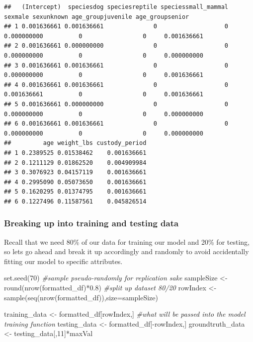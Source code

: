 \documentclass[
]{article}
\newenvironment{Shaded}{\begin{snugshade}}{\end{snugshade}}
\newcommand{\AttributeTok}[1]{\textcolor[rgb]{0.77,0.63,0.00}{#1}}
\newcommand{\CommentTok}[1]{\textcolor[rgb]{0.56,0.35,0.01}{\textit{#1}}}
\newcommand{\DecValTok}[1]{\textcolor[rgb]{0.00,0.00,0.81}{#1}}
\newcommand{\FloatTok}[1]{\textcolor[rgb]{0.00,0.00,0.81}{#1}}
\newcommand{\FunctionTok}[1]{\textcolor[rgb]{0.00,0.00,0.00}{#1}}
\newcommand{\NormalTok}[1]{#1}
\newcommand{\OtherTok}[1]{\textcolor[rgb]{0.56,0.35,0.01}{#1}}
\newcommand{\SpecialCharTok}[1]{\textcolor[rgb]{0.00,0.00,0.00}{#1}}
\begin{document}
\begin{verbatim}
##   (Intercept)  speciesdog speciesreptile speciessmall_mammal     sexmale sexunknown age_groupjuvenile age_groupsenior
## 1 0.001636661 0.001636661              0                   0 0.000000000          0                 0     0.001636661
## 2 0.001636661 0.000000000              0                   0 0.000000000          0                 0     0.000000000
## 3 0.001636661 0.001636661              0                   0 0.000000000          0                 0     0.001636661
## 4 0.001636661 0.001636661              0                   0 0.001636661          0                 0     0.001636661
## 5 0.001636661 0.000000000              0                   0 0.000000000          0                 0     0.000000000
## 6 0.001636661 0.001636661              0                   0 0.000000000          0                 0     0.000000000
##         age weight_lbs custody_period
## 1 0.2389525 0.01538462    0.001636661
## 2 0.1211129 0.01862520    0.004909984
## 3 0.3076923 0.04157119    0.001636661
## 4 0.2995090 0.05073650    0.001636661
## 5 0.1620295 0.01374795    0.001636661
## 6 0.1227496 0.11587561    0.045826514
\end{verbatim}

\hypertarget{breaking-up-into-training-and-testing-data}{%
\subsubsection{Breaking up into training and testing
data}\label{breaking-up-into-training-and-testing-data}}

Recall that we need 80\% of our data for training our model and 20\% for
testing, so lets go ahead and break it up accordingly and randomly to
avoid accidentally fitting our model to specific attributes.

\begin{Shaded}
\begin{Highlighting}[]
\FunctionTok{set.seed}\NormalTok{(}\DecValTok{70}\NormalTok{) }\CommentTok{\#sample pseudo{-}randomly for replication sake}
\NormalTok{sampleSize }\OtherTok{\textless{}{-}} \FunctionTok{round}\NormalTok{(}\FunctionTok{nrow}\NormalTok{(formatted\_df)}\SpecialCharTok{*}\FloatTok{0.8}\NormalTok{) }\CommentTok{\#split up dataset 80/20}
\NormalTok{rowIndex }\OtherTok{\textless{}{-}} \FunctionTok{sample}\NormalTok{(}\FunctionTok{seq}\NormalTok{(}\FunctionTok{nrow}\NormalTok{(formatted\_df)),}\AttributeTok{size=}\NormalTok{sampleSize)}

\NormalTok{training\_data }\OtherTok{\textless{}{-}}\NormalTok{ formatted\_df[rowIndex,] }\CommentTok{\#what will be passed into the model training function}
\NormalTok{testing\_data }\OtherTok{\textless{}{-}}\NormalTok{  formatted\_df[}\SpecialCharTok{{-}}\NormalTok{rowIndex,]}
\NormalTok{groundtruth\_data }\OtherTok{\textless{}{-}}\NormalTok{ testing\_data[,}\DecValTok{11}\NormalTok{]}\SpecialCharTok{*}\NormalTok{maxVal}
\end{Highlighting}
\end{Shaded}
\end{document}
